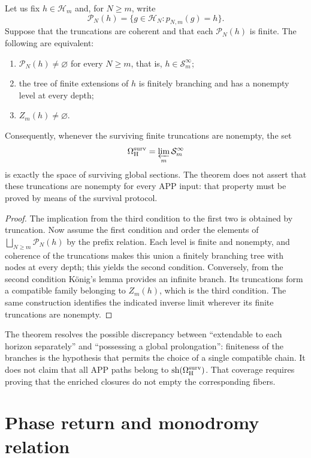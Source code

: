 \begin{theorem}
\label{thm:criterio-extension-superviviente}
Let us fix \(h\in\mathcal H_m\) and, for \(N\geq m\), write
\[
 \mathcal P_N(h)=\{g\in\mathcal H_N:p_{N,m}(g)=h\}.
\]
Suppose that the truncations are coherent and that each
\(\mathcal P_N(h)\) is finite. The following are equivalent:
\begin{enumerate}
  \item \(\mathcal P_N(h)\ne\varnothing\) for every \(N\geq m\), that is,
  \(h\in\mathcal S_m^\infty\);
  \item the tree of finite extensions of \(h\) is finitely branching
  and has a nonempty level at every depth;
  \item \(Z_m(h)\ne\varnothing\).
\end{enumerate}
Consequently, whenever the surviving finite truncations are nonempty, the set
\[
 \Omega_{\rm H}^{\rm surv}
 =\varprojlim_m\mathcal S_m^\infty
\]
is exactly the space of surviving global sections. The theorem does not
assert that these truncations are nonempty for every APP input: that
property must be proved by means of the survival protocol.
\end{theorem}

\begin{proof}
The implication from the third condition to the first two is obtained by
truncation. Now assume the first condition and order the elements of
\(\bigsqcup_{N\geq m}\mathcal P_N(h)\) by the prefix relation. Each level
is finite and nonempty, and coherence of the truncations makes this union
a finitely branching tree with nodes at every depth; this yields the
second condition. Conversely, from the second condition König's lemma
provides an infinite branch. Its truncations form a compatible family
belonging to \(Z_m(h)\), which is the third condition. The same construction
identifies the indicated inverse limit wherever its finite truncations are
nonempty.
\end{proof}

The theorem resolves the possible discrepancy between “extendable to each
horizon separately” and “possessing a global prolongation”: finiteness of the
branches is the hypothesis that permits the choice of a single compatible chain. It does not
claim that all APP paths belong to
\(\operatorname{sh}(\Omega_{\rm H}^{\rm surv})\). That coverage requires proving
that the enriched closures do not empty the corresponding fibers.

\section{Phase return and monodromy relation}

